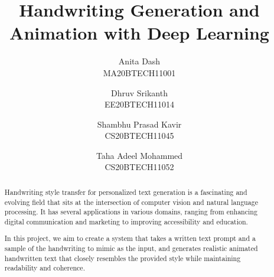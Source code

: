\documentclass[10pt,twocolumn,letterpaper]{article}
\begin{document}
\title{Handwriting Generation and Animation with Deep Learning}

\author{Anita Dash\\
MA20BTECH11001\\
\and
Dhruv Srikanth\\
EE20BTECH11014\\
\and
Shambhu Prasad Kavir\\
CS20BTECH11045\\
\and
Taha Adeel Mohammed\\
CS20BTECH11052\\
}

\maketitle

\begin{abstract}
   Handwriting style transfer for personalized text generation is a fascinating and evolving field that sits at the intersection of computer vision and natural language processing. It has several applications in various domains, ranging from enhancing digital communication and marketing to improving accessibility and education.

   In this project, we aim to create a system that takes a written text prompt and a sample of the handwriting to mimic as the input, and generates realistic animated handwritten text that closely resembles the provided style while maintaining readability and coherence.
\end{abstract}
\end{document}
